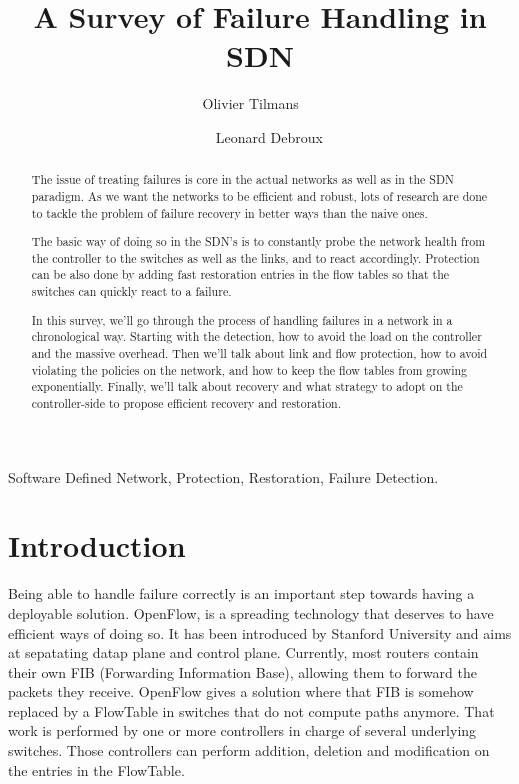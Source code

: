 \documentclass[compsoc]{IEEEtran}
\author{Olivier Tilmans ~~\and~~ Leonard Debroux}
\title{A Survey of Failure Handling in SDN}
\begin{document}
\maketitle
\begin{abstract}
The issue of treating failures is core in the actual networks as well as in the SDN paradigm. As we want the networks to be efficient and robust, lots of research are done to tackle the problem of failure recovery in better ways than the naive ones.

The basic way of doing so in the SDN's is to constantly probe the network health from the controller to the switches as well as the links, and to react accordingly. Protection can be also done by adding fast restoration entries in the flow tables so that the switches can quickly react to a failure.

In this survey, we'll go through the process of handling failures in a network in a chronological way. Starting with the detection, how to avoid the load on the controller and the massive overhead. Then we'll talk about link and flow protection, how to avoid violating the policies on the network, and how to keep the flow tables from growing exponentially. Finally, we'll talk about recovery and what strategy to adopt on the controller-side to propose efficient recovery and restoration.
\end{abstract}

\begin{IEEEkeywords}
Software Defined Network, Protection, Restoration, Failure Detection.
\end{IEEEkeywords}

\section{Introduction}
Being able to handle failure correctly is an important step towards having a deployable solution. OpenFlow, is a spreading technology that deserves to have efficient ways of doing so. It has been introduced by Stanford University and aims at sepatating datap plane and control plane. Currently, most routers contain their own FIB (Forwarding Information Base), allowing them to forward the packets they receive. OpenFlow gives a solution where that FIB is somehow replaced by a FlowTable in switches that do not compute paths anymore. That work is performed by one or more controllers in charge of several underlying switches. Those controllers can perform addition, deletion and modification on the entries in the FlowTable.
\end{document}
